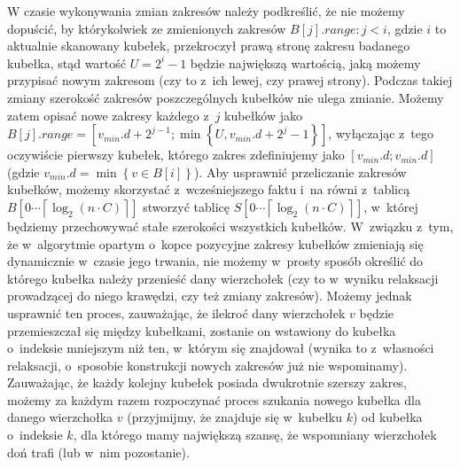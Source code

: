 W czasie wykonywania zmian zakresów należy podkreślić, że nie możemy dopuścić, by którykolwiek ze zmienionych zakresów $B \left[ j \right].range : j < i$, gdzie $i$ to aktualnie skanowany kubełek, przekroczył prawą stronę zakresu badanego kubełka, stąd wartość $U = 2^{i} - 1$ będzie największą wartością, jaką możemy przypisać nowym zakresom (czy to z~ich lewej, czy prawej strony). Podczas takiej zmiany szerokość zakresów poszczególnych kubełków nie ulega zmianie. Możemy zatem opisać nowe zakresy każdego z~$j$ kubełków jako $B \left[ j \right].range = \left[ v_{min}.d + 2 ^{j-1} ; \min \left\{ U, v_{min}.d + 2^{j} - 1 \right\} \right] \label{eq:radixHeapNewBucketRange}$, wyłączając z~tego oczywiście pierwszy kubełek, którego zakres zdefiniujemy jako $\left[ v_{min}.d ; v_{min}.d \right]$ (gdzie $v_{min}.d = \min \left\{ v \in B \left[ i \right] \right\}$). Aby usprawnić przeliczanie zakresów kubełków, możemy skorzystać z~wcześniejszego faktu i~na równi z~tablicą $B \left[ 0 \cdots \left \lceil \log_{2} \left( n \cdot C \right) \right \rceil \right]$ stworzyć tablicę $S \left[ 0 \cdots \left \lceil \log_{2} \left( n \cdot C \right) \right \rceil \right]$, w~której będziemy przechowywać stałe szerokości wszystkich kubełków. W~związku z~tym, że w~algorytmie opartym o~kopce pozycyjne zakresy kubełków zmieniają się dynamicznie w~czasie jego trwania, nie możemy w~prosty sposób określić do którego kubełka należy przenieść dany wierzchołek (czy to w~wyniku relaksacji prowadzącej do niego krawędzi, czy też zmiany zakresów). Możemy jednak usprawnić ten proces, zauważając, że ilekroć dany wierzchołek $v$ będzie przemieszczał się między kubełkami, zostanie on wstawiony do kubełka o~indeksie mniejszym niż ten, w~którym się znajdował (wynika to z~własności relaksacji, o~sposobie konstrukcji nowych zakresów już nie wspominamy). Zauważając, że każdy kolejny kubełek posiada dwukrotnie szerszy zakres, możemy za każdym razem rozpoczynać proces szukania nowego kubełka dla danego wierzchołka $v$ (przyjmijmy, że znajduje się w~kubełku $k$) od kubełka o~indeksie $k$, dla którego mamy największą szansę, że wspomniany wierzchołek doń trafi (lub w~nim pozostanie).

